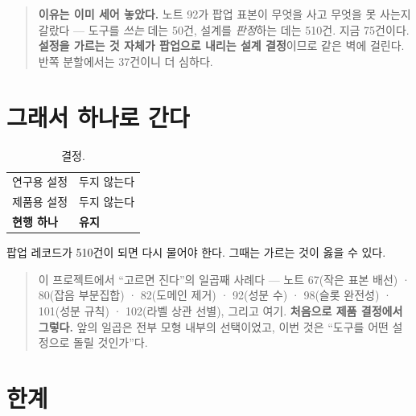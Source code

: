 \documentclass[10pt]{article}
\begin{document}

\begin{quote}\fontsize{9.5}{11.5}\selectfont
\textbf{이유는 이미 세어 놓았다.} 노트 92가 팝업 표본이 무엇을 사고 무엇을
못 사는지 갈랐다 --- 도구를 \emph{쓰는} 데는 50건, 설계를 \emph{판정}하는
데는 510건. 지금 75건이다. \textbf{설정을 가르는 것 자체가 팝업으로 내리는
설계 결정}이므로 같은 벽에 걸린다. 반쪽 분할에서는 37건이니 더 심하다.
\end{quote}

\section{그래서 하나로 간다}

\begin{table}[t]
\centering\tsize
\caption{결정.}
\begin{tabular}{ll}
\toprule
연구용 설정 & 두지 않는다 \\
제품용 설정 & 두지 않는다 \\
\textbf{현행 하나} & \textbf{유지} \\
\bottomrule
\end{tabular}
\end{table}

{팝업 레코드가 510건이 되면 다시 물어야 한다. 그때는 가르는 것이 옳을 수
있다.}

\begin{quote}\fontsize{9.5}{11.5}\selectfont
이 프로젝트에서 ``고르면 진다''의 일곱째 사례다 --- 노트 67(작은 표본 배선) ·
80(잡음 부분집합) · 82(도메인 제거) · 92(성분 수) · 98(슬롯 완전성) ·
101(성분 규칙) · 102(라벨 상관 선별), 그리고 여기. \textbf{처음으로 제품
결정에서 그렇다.} 앞의 일곱은 전부 모형 내부의 선택이었고, 이번 것은 ``도구를
어떤 설정으로 돌릴 것인가''다.
\end{quote}

\section{한계}
\end{document}
